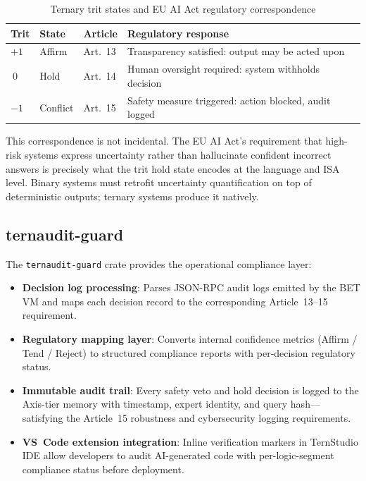 \documentclass[11pt,a4paper]{article}
\begin{document}
\begin{table}[htbp]
\centering
\small
\caption{Ternary trit states and EU AI Act regulatory correspondence}
\label{tab:euaiact}
\begin{tabular}{p{1.0cm}p{1.4cm}p{1.3cm}p{3.4cm}}
\toprule
Trit & State & Article & Regulatory response \\
\midrule
$+1$ & Affirm & Art.~13 & Transparency satisfied: output may be acted upon \\
$\ 0$ & Hold & Art.~14 & Human oversight required: system withholds decision \\
$-1$ & Conflict & Art.~15 & Safety measure triggered: action blocked, audit logged \\
\bottomrule
\end{tabular}
\end{table}

This correspondence is not incidental. The EU AI Act's requirement that
high-risk systems express uncertainty rather than hallucinate confident
incorrect answers is precisely what the trit hold state encodes at the
language and ISA level. Binary systems must retrofit uncertainty
quantification on top of deterministic outputs; ternary systems produce
it natively.

\subsection{ternaudit-guard}

The \texttt{ternaudit-guard} crate provides the operational compliance layer:

\begin{itemize}
  \item \textbf{Decision log processing}: Parses JSON-RPC audit logs emitted
        by the BET VM and maps each decision record to the corresponding
        Article~13--15 requirement.
  \item \textbf{Regulatory mapping layer}: Converts internal confidence
        metrics (Affirm / Tend / Reject) to structured compliance reports
        with per-decision regulatory status.
  \item \textbf{Immutable audit trail}: Every safety veto and hold decision
        is logged to the Axis-tier memory with timestamp, expert identity,
        and query hash---satisfying the Article~15 robustness and
        cybersecurity logging requirements.
  \item \textbf{VS~Code extension integration}: Inline verification markers
        in TernStudio IDE allow developers to audit AI-generated code with
        per-logic-segment compliance status before deployment.
\end{itemize}
\end{document}
